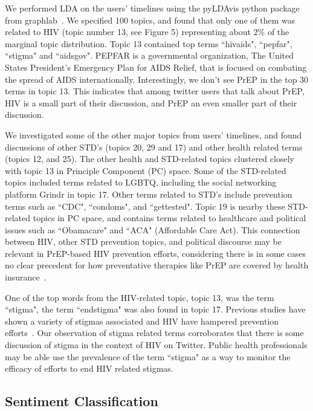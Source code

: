 \documentclass{sig-alternate-05-2015}
\begin{document}
We performed LDA on the users' timelines using the pyLDAvis python package from graphlab~\cite{low2014graphlab}. We specified 100 topics, and found that only one of them was related to HIV (topic number 13, see Figure 5) representing about 2\% of the marginal topic distribution. Topic 13 contained top terms ``hivaids", ``pepfar", ``stigma" and ``aidsgov". PEPFAR is a governmental organization, The United States President's Emergency Plan for AIDS Relief, that is focused on combating the spread of AIDS internationally. Interestingly, we don't see PrEP in the top 30 terms in topic 13. This indicates that among twitter users that talk about PrEP, HIV is a small part of their discussion, and PrEP an even smaller part of their discussion.

We investigated some of the other major topics from users' timelines, and found discussions of other STD's (topics 20, 29 and 17) and other health related terms (topics 12, and 25). The other health and STD-related topics clustered closely with topic 13 in Principle Component (PC) space. Some of the STD-related topics included terms related to LGBTQ, including the social networking platform Grindr in topic 17. Other terms related to STD's include prevention terms such as ``CDC", ``condoms", and ``gettested". Topic 19 is nearby these STD-related topics in PC space, and contains terms related to healthcare and political issues such as ``Obamacare" and ``ACA" (Affordable Care Act). This connection between HIV, other STD prevention topics, and political discourse may be relevant in PrEP-based HIV prevention efforts, considering there is in some cases no clear precedent for how preventative therapies like PrEP are covered by health insurance~\cite{liu2014early}.

One of the top words from the HIV-related topic, topic 13, was the term ``stigma", the term ``endstigma" was also found in topic 17. Previous studies have shown a variety of stigmas associated and HIV have hampered prevention efforts~\cite{liu2014early}. Our observation of stigma related terms corroborates that there is some discussion of stigma in the context of HIV on Twitter. Public health professionals may be able use the prevalence of the term ``stigma" as a way to monitor the efficacy of efforts to end HIV related stigmas.

\subsection{Sentiment Classification}
\end{document}
